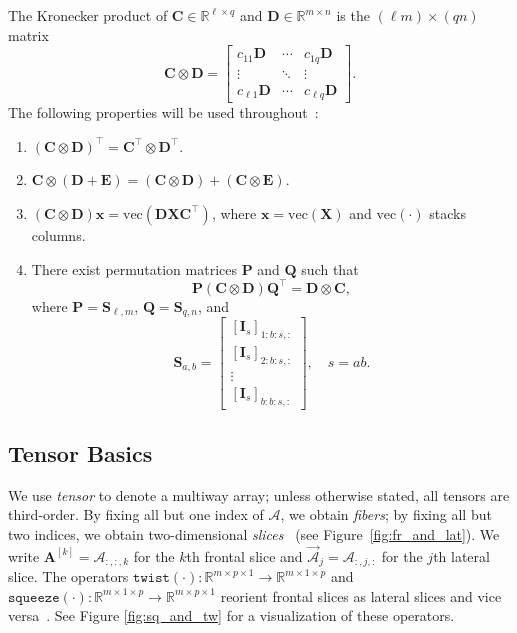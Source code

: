 \documentclass{siamart251216}
\newcommand{\tens}[1]{\mathbf{\mathcal{#1}}}
\newcommand{\RR}[2]{\mathbb{R}^{#1 \times #2}}
\newcommand{\RRR}[3]{\mathbb{R}^{#1 \times #2 \times #3}}
\newcommand{\lat}[2]{\overrightarrow{\tens{#1}}_#2}
\newcommand{\frontal}[2]{\mathbf{#1}^{[#2]}}
\def\bC{\mathbf{C}}
\def\bD{\mathbf{D}}
\def\bE{\mathbf{E}}
\def\bI{\mathbf{I}}
\def\bP{\mathbf{P}}
\def\bQ{\mathbf{Q}}
\def\bS{\mathbf{S}}
\def\bX{\mathbf{X}}
\def\bx{\mathbf{x}}
\begin{document}
The Kronecker product of $\bC\in\RR{\ell}{q}$ and $\bD\in\RR{m}{n}$ is the $(\ell m)\times(qn)$
matrix
\begin{equation*}
    \bC \otimes \bD =
    \begin{bmatrix}
        c_{11}\bD & \cdots & c_{1q}\bD\\
        \vdots    & \ddots & \vdots   \\
        c_{\ell 1}\bD & \cdots & c_{\ell q}\bD
    \end{bmatrix}.
\end{equation*}
The following properties will be used
throughout~\cite{Ballard_Kolda_2025,graham2018kronecker,vanloan2000ubiquitous,magnus1979commutation}:
\begin{enumerate}
    \item $(\bC\otimes\bD)^\top = \bC^\top\otimes\bD^\top$.
    \item $\bC\otimes(\bD+\bE) = (\bC\otimes\bD)+(\bC\otimes\bE)$.
    \item $(\bC\otimes\bD)\bx = \mathrm{vec}(\bD\bX\bC^\top)$, where $\bx=\mathrm{vec}(\bX)$ and
          $\mathrm{vec}(\cdot)$ stacks columns.
    \item There exist permutation matrices $\bP$ and $\bQ$ such that
          $$\bP(\bC\otimes\bD)\bQ^\top = \bD\otimes\bC,$$ where $\bP = \bS_{\ell,m}$,
          $\bQ = \bS_{q,n}$, and
          \begin{equation}
          \label{eq:shuffle_matrix}
              \bS_{a,b} =
              \begin{bmatrix}
                  [\bI_s]_{1:b:s,:}\\
                  [\bI_s]_{2:b:s,:}\\
                  \vdots\\
                  [\bI_s]_{b:b:s,:}
              \end{bmatrix}, \quad s = ab.
          \end{equation}
\end{enumerate}

\subsection{Tensor Basics}
\label{sec:tensor_basics}

We use \emph{tensor} to denote a multiway array; unless otherwise stated, all tensors are
third-order.  By fixing all but one index of $\tens{A}$, we obtain \emph{fibers}; by fixing all
but two indices, we obtain two-dimensional \emph{slices}~\cite{kolda2009tensor} (see Figure~\ref{fig:fr_and_lat}).  We write
$\frontal{A}{k} = \tens{A}_{:,:,k}$ for the $k$th frontal slice and
$\lat{A}{j} = \tens{A}_{:,j,:}$ for the $j$th lateral slice.  The operators
$\mathtt{twist}(\cdot)\colon\RRR{m}{p}{1}\to\RRR{m}{1}{p}$ and
$\mathtt{squeeze}(\cdot)\colon\RRR{m}{1}{p}\to\RRR{m}{p}{1}$ reorient frontal slices as lateral
slices and vice versa~\cite{kilmer2013TensorOperator}. See Figure \ref{fig:sq_and_tw} for a visualization of these operators.
\end{document}
